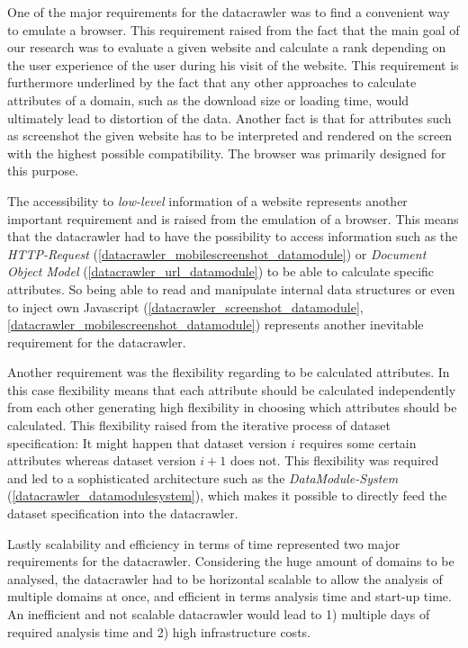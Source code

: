 One of the major requirements for the datacrawler was to find a convenient way to emulate a browser. This requirement raised from the fact that the main goal of our research was to evaluate a given website and calculate a rank depending on the user experience of the user during his visit of the website. This requirement is furthermore underlined by the fact that any other approaches to calculate attributes of a domain, such as the download size or loading time, would ultimately lead to distortion of the data. Another fact is that for attributes such as screenshot the given website has to be interpreted and rendered on the screen with the highest possible compatibility. The browser was primarily designed for this purpose.

The accessibility to \textit{low-level} information of a website represents another important requirement and is raised from the emulation of a browser. This means that the datacrawler had to have the possibility to access information such as the \textit{HTTP-Request} (\ref{datacrawler_mobilescreenshot_datamodule}) or \textit{Document Object Model} (\ref{datacrawler_url_datamodule}) to be able to calculate specific attributes. So being able to read and manipulate internal data structures or even to inject own Javascript (\ref{datacrawler_screenshot_datamodule}, \ref{datacrawler_mobilescreenshot_datamodule})  represents another inevitable requirement for the datacrawler.

Another requirement was the flexibility regarding to be calculated attributes. In this case flexibility means that each attribute should be calculated independently from each other generating high flexibility in choosing which attributes should be calculated. This flexibility raised from the iterative process of dataset specification: It might happen that dataset version $i$ requires some certain attributes whereas dataset version $i+1$ does not. This flexibility was required and led to a sophisticated architecture such as the \textit{DataModule-System} (\ref{datacrawler_datamodulesystem}), which makes it possible to directly feed the dataset specification into the datacrawler.

Lastly scalability and efficiency in terms of time represented two major requirements for the datacrawler. Considering the huge amount of domains to be analysed, the datacrawler had to be horizontal scalable to allow the analysis of multiple domains at once, and efficient in terms analysis time and start-up time. An inefficient and not scalable datacrawler would lead to 1) multiple days of required analysis time and 2) high infrastructure costs.

